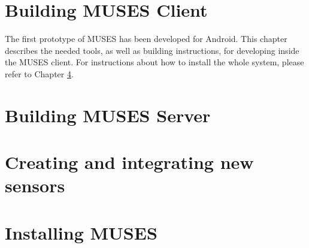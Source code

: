 \documentclass[a4paper,11pt]{book}
\begin{document}
\chapter{Building MUSES Client}
\label{ch:client}

The first prototype of MUSES has been developed for Android. This chapter describes the needed tools, as well as building instructions, for developing inside the MUSES client. For instructions about how to install the whole system, please refer to Chapter \ref{ch:installmuses}.


\chapter{Building MUSES Server}
\label{ch:server}


\chapter{Creating and integrating new sensors}
\label{ch:sensors}


\chapter{Installing MUSES}
\label{ch:installmuses}



\end{document}
